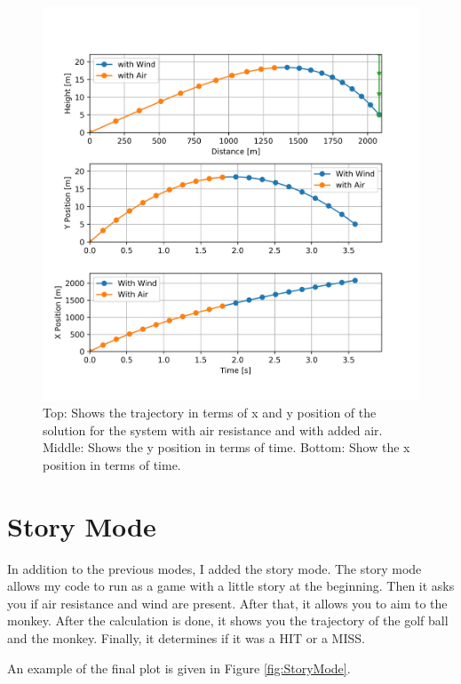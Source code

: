 \begin{figure}
    \centering
    \includegraphics{figures/wa0-99x2082-44y67-97.png}
    \caption{Top: Shows the trajectory in terms of x and y position of the solution for the system with air resistance and with added air. Middle: Shows the y position in terms of time. Bottom: Show the x position in terms of time.}
    \label{fig:Wind}
\end{figure}

\section{Story Mode}
In addition to the previous modes, I added the story mode. The story mode allows my code to run as a game with a little story at the beginning. Then it asks you if air resistance and wind are present. After that, it allows you to aim to the monkey. After the calculation is done, it shows you the trajectory of the golf ball and the monkey. Finally, it determines if it was a HIT or a MISS. 

An example of the final plot is given in Figure \ref{fig:StoryMode}.

